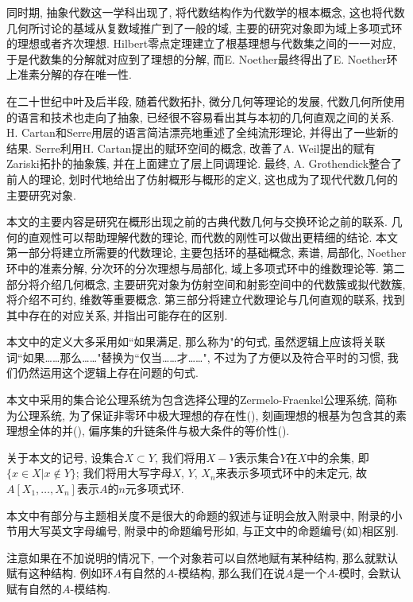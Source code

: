 同时期, 抽象代数这一学科出现了, 将代数结构作为代数学的根本概念, 这也将代数几何所讨论的基域从复数域推广到了一般的域, 主要的研究对象即为域上多项式环的理想或者齐次理想. Hilbert零点定理建立了根基理想与代数集之间的一一对应, 于是代数集的分解就对应到了理想的分解, 而E. Noether最终得出了E. Noether环上准素分解的存在唯一性.

在二十世纪中叶及后半段, 随着代数拓扑, 微分几何等理论的发展, 代数几何所使用的语言和技术也走向了抽象, 已经很不容易看出其与本初的几何直观之间的关系. H. Cartan和Serre用层的语言简洁漂亮地重述了全纯流形理论, 并得出了一些新的结果. Serre利用H. Cartan提出的赋环空间的概念, 改善了A. Weil提出的赋有Zariski拓扑的抽象簇, 并在上面建立了层上同调理论. 最终, A. Grothendick整合了前人的理论, 划时代地给出了仿射概形与概形的定义, 这也成为了现代代数几何的主要研究对象.

本文的主要内容是研究在概形出现之前的古典代数几何与交换环论之前的联系. 几何的直观性可以帮助理解代数的理论, 而代数的刚性可以做出更精细的结论. 本文第一部分将建立所需要的代数理论, 主要包括环的基础概念, 素谱, 局部化, Noether环中的准素分解, 分次环的分次理想与局部化, 域上多项式环中的维数理论等. 第二部分将介绍几何概念, 主要研究对象为仿射空间和射影空间中的代数簇或拟代数簇, 将介绍不可约, 维数等重要概念. 第三部分将建立代数理论与几何直观的联系, 找到其中存在的对应关系, 并指出可能存在的区别.

本文中的定义大多采用如``如果满足, 那么称为"的句式, 虽然逻辑上应该将关联词``如果\dots\dots 那么\dots\dots"替换为``仅当\dots\dots 才\dots\dots ", 不过为了方便以及符合平时的习惯, 我们仍然运用这个逻辑上存在问题的句式.

本文中采用的集合论公理系统为包含选择公理的Zermelo-Fraenkel公理系统, 简称为公理系统, 为了保证非零环中极大理想的存在性(), 刻画理想的根基为包含其的素理想全体的并(), 偏序集的升链条件与极大条件的等价性().

关于本文的记号, 设集合$X\subset Y$, 我们将用$X-Y$表示集合$Y$在$X$中的余集, 即$\{x\in X\vert x\notin Y\}$; 我们将用大写字母$X$, $Y$, $X_n$来表示多项式环中的未定元, 故$A[X_1, \dotsc, X_n]$表示$A$的$n$元多项式环.%

本文中有部分与主题相关度不是很大的命题的叙述与证明会放入附录中, 附录的小节用大写英文字母编号, 附录中的命题编号形如, 与正文中的命题编号(如)相区别.

注意如果在不加说明的情况下, 一个对象若可以自然地赋有某种结构, 那么就默认赋有这种结构. 例如环$A$有自然的$A$-模结构, 那么我们在说$A$是一个$A$-模时, 会默认赋有自然的$A$-模结构.
